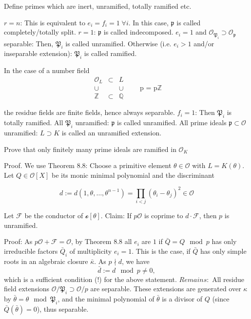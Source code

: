 Define primes which are inert, unramified, totally ramified etc.

\(r = n\): This is equivalent to \(e_i = f_i = 1 \; \forall i\). 
In this case, \(\mathfrak{p}\) is called completely/totally split.
\(r = 1\): \(\mathfrak{p}\) is called indecomposed.
\(e_i = 1\) and \(\mathcal{O}_{\mathfrak{P}_i} \supset \mathcal{O}_{\mathfrak{p}}\) separable: Then, \(\mathfrak{P}_i\) is called unramified. 
Otherwise (i.e. \(e_i > 1\) and/or inseparable extension): \(\mathfrak{P}_i\) is called ramified.

In the case of a number field
\[
\begin{array}{ccc}
\mathcal{O}_L & \subset & L \\
\cup & & \cup \\
\mathbb{Z} & \subset & \mathbb{Q}
\end{array}
\qquad \text{p = p} \mathbb{Z}
\]

the residue fields are finite fields, hence always separable.
\(f_i = 1\): Then \(\mathfrak{P}_i\) is totally ramified.
All \(\mathfrak{P}_i\) unramified: \(\mathfrak{p}\) is called unramified.
All prime ideals \(\mathfrak{p} \subset \mathcal{O}\) unramified: \(L \supset K\) is called an unramified extension.


Prove that only finitely many prime ideals are ramified in \( \mathcal{O}_K \)

Proof. We use Theorem 8.8: 
Choose a primitive element \(\theta \in \mathcal{O}\) with \(L = K(\theta)\). 
Let \(Q \in \mathcal{O}[X]\) be its monic minimal polynomial and the discriminant

\[
d := d(1, \theta, \ldots, \theta^{n-1}) = \prod_{i<j} (\theta_i - \theta_j)^2 \in \mathcal{O}
\]

Let \(\mathcal{F}\) be the conductor of \(\mathcal{o}[\theta]\).
Claim: If \(p\mathcal{O}\) is coprime to \(d \cdot \mathcal{F}\), then \( p \) is unramified.

Proof:
As \(p\mathcal{O} + \mathcal{F} = \mathcal{O}\), by Theorem 8.8 all \( e_i \) are \( 1 \) if \( \bar{Q} = Q \mod p \) has only irreducible factors 
\( \bar{Q}_i \) of multiplicity \( e_i = 1\). 
This is the case, if \( \bar{Q} \) has only simple roots in an algebraic closure \( \bar{\kappa} \). As \( p \nmid d \), we have
\[
\bar{d} := d \mod p \neq 0,
\]
which is a sufficient condition (!) for the above statement.
\( Remains: \) All residue field extensions \(\mathcal{O}/\mathfrak{P}_i \supset \mathcal{O}/p\) are separable. 
These extensions are generated over \(\kappa\) by \(\bar{\theta} = \theta \mod \mathfrak{P}_i\), and the minimal polynomial of 
\(\bar{\theta}\) is a divisor of \( Q \) (since \(\bar{Q}(\bar{\theta}) = 0\)), thus separable.
